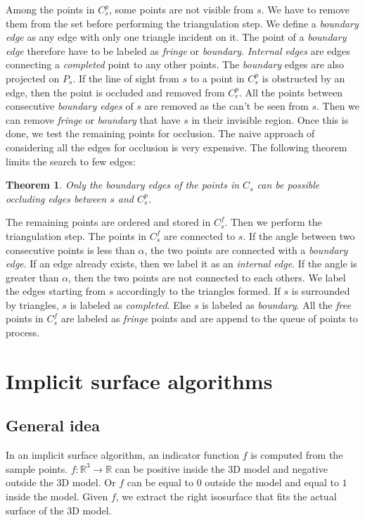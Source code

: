 \documentclass[a4paper]{article}
\begin{document}
Among the points in $C^p_s$, some points are not visible from $s$. We have to remove them from the set before performing the triangulation step. We define a \textit{boundary edge} as any edge with only one triangle incident on it. The point of a \textit{boundary edge} therefore have to be labeled as \textit{fringe} or \textit{boundary}. \textit{Internal edges} are edges connecting a \textit{completed} point to any other points. The \textit{boundary} edges are also projected on $P_s$. If the line of sight from $s$ to a point in $C^p_s$ is obstructed by an edge, then the point is occluded and removed from $C^p_r$. All the points between consecutive \textit{boundary edges} of $s$ are removed as the can't be seen from $s$. Then we can remove \textit{fringe} or \textit{boundary} that have $s$ in their invisible region. Once this is done, we test the remaining points for occlusion. The naive approach of considering all the edges for occlusion is very expensive. The following theorem limits the search to few edges:
\newtheorem{mydef}{Theorem}
\begin{mydef}
Only the \emph{boundary edges} of the points in $C_s$ can be possible occluding edges between $s$ and $C^p_s$.
\end{mydef}

The remaining points are ordered and stored in $C^f_s$. Then we perform the triangulation step. The points in $C^f_s$ are connected to $s$. If the angle between two consecutive points is less than $\alpha$, the two points are connected with a \emph{boundary edge}. If an edge already exists, then we label it as an \emph{internal edge}. If the angle is greater than $\alpha$, then the two points are not connected to each others. We label the edges starting from $s$ accordingly to the triangles formed. If $s$ is surrounded by triangles, $s$ is labeled as \emph{completed}. Else $s$ is labeled as \emph{boundary}. All the \emph{free} points in $C^f_s$ are labeled as \emph{fringe} points and are append to the queue of points to process.

\newpage

\section{Implicit surface algorithms}
\subsection{General idea}
In an implicit surface algorithm, an indicator function $f$ is computed from the sample points. $f:\mathbb{R}^3 \to \mathbb{R}$ can be positive inside the 3D model and negative outside the 3D model. Or $f$ can be equal to $0$ outside the model and equal to $1$ inside the model. Given $f$, we extract the right isosurface that fits the actual surface of the 3D model.
\end{document}

